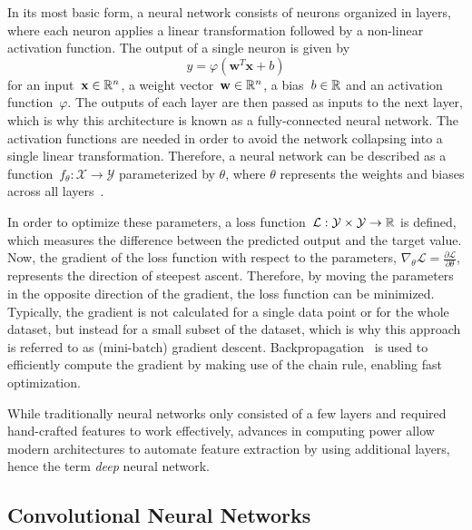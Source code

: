 In its most basic form, a neural network consists of neurons organized in layers, where each neuron
applies a linear transformation followed by a non-linear activation function.
The output of a single neuron is given by
\begin{equation}
    y = \varphi(\mathbf{w}^T\mathbf{x} + b)
\end{equation}
for an input~$\mathbf{x} \in \mathbb{R}^n$, a weight vector~$\mathbf{w} \in \mathbb{R}^n$, a bias~$b \in \mathbb{R}$ and an activation
function~$\varphi$.
The outputs of each layer are then passed as inputs to the next layer, which is why this architecture is known as a
fully-connected neural network. 
The activation functions are needed in order to avoid the network collapsing into a single linear transformation. 
Therefore, a neural network can be described as a function~$f_{\theta}: \mathcal{X} \rightarrow \mathcal{Y}$ 
parameterized by $\theta$, where $\theta$ represents the weights and biases across all layers~\cite{DeepLearning}.

In order to optimize these parameters, a loss function~$\mathcal{L}: \mathcal{Y} \times \mathcal{Y} \rightarrow \mathbb{R}$ is 
defined, which measures the difference between the predicted output and the target value. 
Now, the gradient of the loss function with respect to the parameters, 
$\nabla_\theta \mathcal{L} = \frac{\partial \mathcal{L}}{\partial \theta}$, represents the direction of steepest ascent.
Therefore, by moving the parameters in the opposite direction of the gradient, the loss function can be minimized.
Typically, the gradient is not calculated for a single data point or for the whole dataset, but instead for a
small subset of the dataset, which is why this approach is referred to as (mini-batch) gradient descent.
Backpropagation~\cite{Backpropagation} is used to efficiently compute the gradient by making use of the
chain rule, enabling fast optimization.

While traditionally neural networks only consisted of a few layers and required hand-crafted features to work 
effectively, advances in computing power allow modern architectures to automate feature extraction by using additional 
layers, hence the term \textit{deep} neural network.

\subsection{Convolutional Neural Networks}

